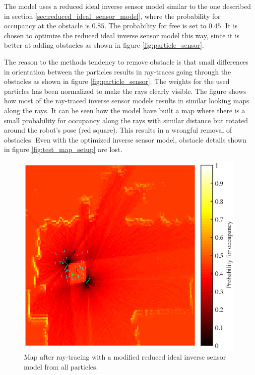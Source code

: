 The model uses a reduced ideal inverse sensor model similar to the one described in section \vref{sec:reduced_ideal_sensor_model}, where the probability for occupancy at the obstacle is $0.85$. The probability for free is set to $0.45$. 
It is chosen to optimize the reduced ideal inverse sensor model this way, since it is better at adding obstacles as shown in figure \vref{fig:particle_sensor}.

The reason to the methods tendency to remove obstacle is that small differences in orientation between the particles results in ray-traces going through the obstacles as shown in figure \vref{fig:particle_sensor}. The weights for the used particles has been normalized to make the rays clearly visible. 
The figure shows how most of the ray-traced inverse sensor models results in similar looking maps along the rays. 
It can be seen how the model have built a map where there is a small probability for occupancy along the rays with similar distance but rotated around the robot's pose (red square). This results in a wrongful removal of obstacles.
Even with the optimized inverse sensor model, obstacle details shown in figure \ref{fig:test_map_setup} are lost. 

\begin{figure}[htbp]
	\centering
	\includegraphics[scale=1.0]{figures/static_mapping/particle_principle}
	\caption{Map after ray-tracing with a modified reduced ideal inverse sensor model from all particles.}
	\label{fig:particle_principle}
\end{figure}

